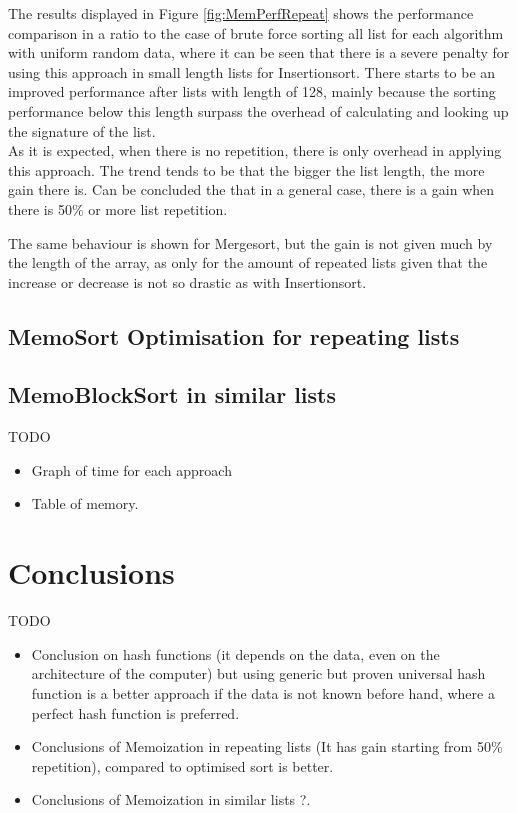 \documentclass[a4paper,12pt]{article}
\begin{document}
The results displayed in Figure \ref{fig:MemPerfRepeat} shows the performance comparison in a ratio to the case of brute force sorting all list for each algorithm with uniform random data, where it can be seen that there is a severe penalty for using this approach in small length lists for Insertionsort. There starts to be an improved performance after lists with length of 128, mainly because the sorting performance below this length surpass the overhead of calculating and looking up the signature of the list. \\
As it is expected, when there is no repetition, there is only overhead in applying this approach. The trend tends to be that the bigger the list length, the more gain there is. Can be concluded the that in a general case, there is a gain when there is 50\% or more list repetition.

The same behaviour is shown for Mergesort, but the gain is not given much by the length of the array, as only for the amount of repeated lists given that the increase or decrease is not so drastic as with Insertionsort.



\subsection{MemoSort Optimisation for repeating lists}

\subsection{MemoBlockSort in similar lists}

TODO
\begin{itemize}
\item Graph of time for each approach
\item Table of memory.
\end{itemize}

\section{Conclusions}

TODO
\begin{itemize}
\item Conclusion on hash functions (it depends on the data, even on the architecture of the computer) but using generic but proven universal hash function is a better approach if the data is not known before hand, where a perfect hash function is preferred.
\item Conclusions of Memoization in repeating lists (It has gain starting from 50\% repetition), compared to optimised sort is better.
\item  Conclusions of Memoization in similar lists ?.
\end{itemize}
\end{document}
